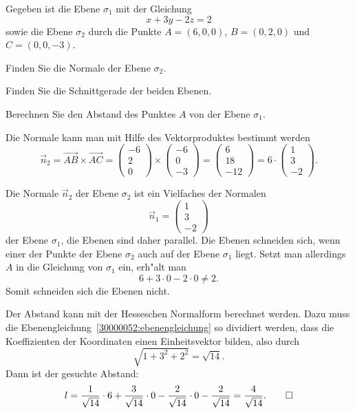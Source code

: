 Gegeben ist die Ebene $\sigma_1$ mit der Gleichung
\begin{equation}
x+3y-2z=2
\label{30000052:ebenengleichung}
\end{equation}
sowie die Ebene $\sigma_2$ durch die Punkte $A=(6,0,0)$, $B=(0,2,0)$ und
$C=(0,0,-3)$.
\begin{teilaufgaben}
\item
Finden Sie die Normale der Ebene $\sigma_2$.
\item 
Finden Sie die Schnittgerade der beiden Ebenen.
\item 
Berechnen Sie den Abstand des Punktes $A$ von der Ebene $\sigma_1$.
\end{teilaufgaben}

\begin{loesung}
\begin{teilaufgaben}
\item
Die Normale kann man mit Hilfe des Vektorproduktes bestimmt werden
\[
\vec{n}_2
=
\overrightarrow{AB}\times\overrightarrow{AC}
=
\begin{pmatrix}
-6\\
 2\\
 0
\end{pmatrix}
\times
\begin{pmatrix}
-6\\
 0\\
-3
\end{pmatrix}
=
\begin{pmatrix}
6\\
18\\
-12
\end{pmatrix}
=
6\cdot\begin{pmatrix}
1\\
3\\
-2
\end{pmatrix}.
\]
\item
Die Normale $\vec{n}_2$ der Ebene $\sigma_2$ ist ein Vielfaches der
Normalen
\[
\vec{n}_1=\begin{pmatrix}1\\3\\-2\end{pmatrix}
\]
der Ebene $\sigma_1$, die Ebenen sind daher parallel.
Die Ebenen schneiden sich, wenn einer der Punkte der Ebene $\sigma_2$ auch
auf der Ebene $\sigma_1$ liegt. 
Setzt man allerdings $A$ in die Gleichung von $\sigma_1$ ein, erh"alt man
\[
6+3\cdot 0-2\cdot 0 \ne 2.
\]
Somit schneiden sich die Ebenen nicht.
\item
Der Abstand kann mit der Hesseschen Normalform berechnet werden.
Dazu muss die Ebenengleichung~\eqref{30000052:ebenengleichung}
so dividiert werden, dass die Koeffizienten der Koordinaten einen
Einheitsvektor bilden, also durch
\[
\sqrt{1+3^2+2^2}=\sqrt{14}.
\]
Dann ist der gesuchte Abstand:
\[
l
=
\frac1{\sqrt{14}}\cdot 6
+\frac3{\sqrt{14}}\cdot 0
-\frac2{\sqrt{14}}\cdot 0
-\frac2{\sqrt{14}}
=
\frac4{\sqrt{14}}.
\qedhere
\]
\end{teilaufgaben}
\end{loesung}

